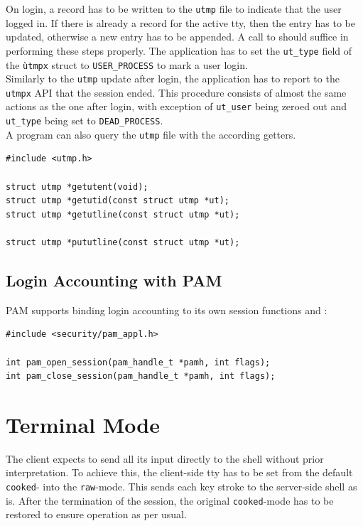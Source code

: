 \documentclass[10pt,a4paper,titlepage,twoside,english,final]{zhawreprt}
\begin{document}
On login, a record has to be written to the \texttt{utmp} file to indicate that the user logged in. If there is already a record for the active \gls{tty}, then the entry has to be updated, otherwise a new entry has to be appended. A call to \cite{pututxline} should suffice in performing these steps properly. The application has to set the \texttt{ut\_type} field of the \texttt{ùtmpx} struct to \texttt{USER\_PROCESS} to mark a user login.\\
Similarly to the \texttt{utmp} update after login, the application has to report to the \texttt{utmpx} \gls{API} that the session ended. This procedure consists of almost the same actions as the one after login, with exception of \texttt{ut\_user} being zeroed out and \texttt{ut\_type} being set to \texttt{DEAD\_PROCESS}\citep[p.828]{KerriskTLPI}.\\
A program can also query the \texttt{utmp} file with the according getters.
\setlistingC
\begin{lstlisting}[caption={\texttt{utmpx} \gls{API} functions},label=lst:UtmpxApiFunctions]
#include <utmp.h>

struct utmp *getutent(void);
struct utmp *getutid(const struct utmp *ut);
struct utmp *getutline(const struct utmp *ut);

struct utmp *pututline(const struct utmp *ut);
\end{lstlisting}

\subsection{Login Accounting with PAM}\label{ssec:LoginAccountingWithPAM}
\gls{PAM} supports binding login accounting to its own session functions \cite{pam_open_session} and \cite{pam_close_session}:
\setlistingC
\begin{lstlisting}[caption={\gls{PAM} session management},label=lst:PAMSessionManagement]
#include <security/pam_appl.h>

int pam_open_session(pam_handle_t *pamh, int flags);
int pam_close_session(pam_handle_t *pamh, int flags);
\end{lstlisting}

\section{Terminal Mode}\label{sec:TerminalMode}
The client expects to send all its input directly to the \gls{shell} without prior interpretation. To achieve this, the client-side \gls{tty} has to be set from the default \texttt{cooked}- into the \texttt{raw}-mode\citep[p.1309]{KerriskTLPI}. This sends each key stroke to the server-side \gls{shell} as is. After the termination of the session, the original \texttt{cooked}-mode has to be restored to ensure operation as per usual.
\end{document}
